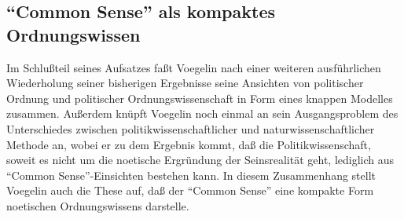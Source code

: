 

\subsection{"`Common Sense"' als kompaktes Ordnungswissen} 

Im Schlußteil seines Aufsatzes faßt Voegelin nach einer weiteren
ausführlichen Wiederholung seiner bisherigen Ergebnisse seine Ansichten von
politischer Ordnung und politischer Ordnungswissenschaft in Form eines knappen
Modelles zusammen. Außerdem knüpft Voegelin noch einmal an sein
Ausgangsproblem des Unterschiedes zwischen politikwissenschaftlicher und
naturwissenschaftlicher Methode an, wobei er zu dem Ergebnis kommt, daß die
Politikwissenschaft, soweit es nicht um die noetische Ergründung der
Seinsrealität geht, lediglich aus "`Common Sense"'-Einsichten bestehen kann.
In diesem Zusammenhang stellt Voegelin auch die These auf, daß der "`Common
Sense"' eine kompakte Form noetischen Ordnungswissens darstelle.

